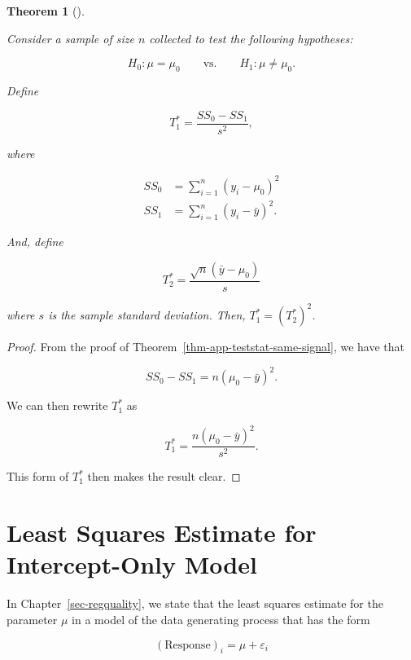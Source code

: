 \documentclass[
  letterpaper,
  DIV=11,
  numbers=noendperiod]{scrreprt}
\theoremstyle{definition}
\theoremstyle{definition}
\theoremstyle{plain}
\newtheorem{theorem}{Theorem}[chapter]
\theoremstyle{remark}
\begin{document}
\begin{theorem}[]\protect\hypertarget{thm-app-teststat-two-statistics}{}\label{thm-app-teststat-two-statistics}

Consider a sample of size \(n\) collected to test the following
hypotheses:

\[H_0: \mu = \mu_0 \qquad \text{vs.} \qquad H_1: \mu \neq \mu_0.\]

Define

\[T_1^* = \frac{SS_0 - SS_1}{s^2},\]

where

\[
\begin{aligned}
  SS_0 &= \sum_{i=1}^{n} \left(y_i - \mu_0\right)^2 \\
  SS_1 &= \sum_{i=1}^{n} \left(y_i - \bar{y}\right)^2.
\end{aligned}
\]

And, define

\[T_2^* = \frac{\sqrt{n} \left(\bar{y} - \mu_0\right)}{s}\]

where \(s\) is the sample standard deviation. Then,
\(T_1^* = \left(T_2^*\right)^2\).

\end{theorem}

\begin{proof}

From the proof of Theorem~\ref{thm-app-teststat-same-signal}, we have
that

\[SS_0 - SS_1 = n \left(\mu_0 - \bar{y}\right)^2.\]

We can then rewrite \(T_1^*\) as

\[T_1^* = \frac{n\left(\mu_0 - \bar{y}\right)^2}{s^2}.\]

This form of \(T_1^*\) then makes the result clear.

\end{proof}

\hypertarget{least-squares-estimate-for-intercept-only-model}{%
\section{Least Squares Estimate for Intercept-Only
Model}\label{least-squares-estimate-for-intercept-only-model}}

In Chapter~\ref{sec-regquality}, we state that the least squares
estimate for the parameter \(\mu\) in a model of the data generating
process that has the form

\[(\text{Response})_i = \mu + \varepsilon_i\]
\end{document}
